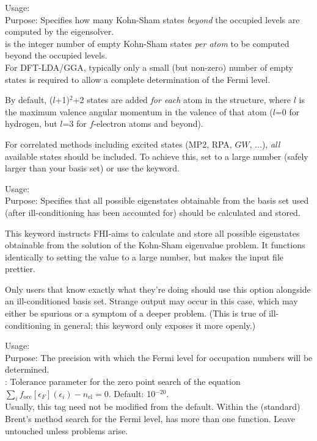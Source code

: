 {
  \noindent
  Usage:   \\[1.0ex]
  Purpose: Specifies how many Kohn-Sham states \emph{beyond} the occupied levels
    are computed by the eigensolver. \\[1.0ex]
   is the integer number of empty Kohn-Sham states
    \emph{per atom} to be computed beyond the occupied levels. \\
}
For DFT-LDA/GGA, typically only a small (but non-zero) number of empty states is
required to allow a complete determination of the Fermi level.

By default, ($l$+1)$^2$+2 states are added \emph{for each} atom in the
structure, where $l$ is the maximum valence angular momentum in the valence of
that atom ($l$=0 for hydrogen, but $l$=3 for $f$-electron atoms and beyond).

For correlated methods including excited states (MP2, RPA, $GW$, ...),
\emph{all} available states should be included. To achieve this, set
 to a large number (safely larger than your basis set) or
use the  keyword.

{
  \noindent
  Usage:  \\[1.0ex]
  Purpose: Specifies that all possible eigenstates obtainable from the basis set
    used (after ill-conditioning has been accounted for) should be calculated
    and stored. \\[1.0ex]
}

This keyword instructs FHI-aims to calculate and store all possible eigenstates
obtainable from the solution of the Kohn-Sham eigenvalue problem. It functions
identically to setting the  value to a large number, but
makes the input file prettier.

Only users that know exactly what they're doing should use this option alongside
an ill-conditioned basis set. Strange output may occur in this case, which may
either be spurious or a symptom of a deeper problem. (This is true of
ill-conditioning in general; this keyword only exposes it more openly.)

{
  \noindent
  Usage:   \\[1.0ex]
  Purpose: The precision with which the Fermi level for occupation numbers will
    be determined. \\[1.0ex]
   : Tolerance parameter for the zero point search of the
    equation $\sum_i f_\text{occ}[\epsilon_F](\epsilon_i) - n_\text{el} = 0$.
    Default: 10$^{-20}$. \\
}
Usually, this tag need not be modified from the default. Within the (standard)
Brent's method search for the Fermi level,  has more than one
function. Leave untouched unless problems arise.

